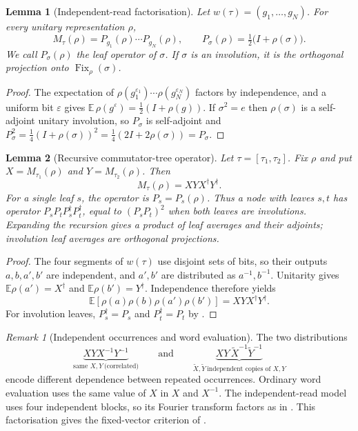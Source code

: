 \documentclass[11pt]{amsart}
\newtheorem{lemma}[lemma]{Lemma}
\theoremstyle{definition}
\theoremstyle{remark}
\newtheorem{remark}[remark]{Remark}
\theoremstyle{plain}
\theoremstyle{plain}
\numberwithin{equation}{section}
\DeclareMathOperator{\Fix}{Fix}
\begin{document}
\begin{lemma}[Independent-read factorisation]
\label{lem:factor}
Let $w(\tau)=(g_1,\ldots,g_N)$. For every unitary representation $\rho$,
\[
 M_\tau(\rho)=P_{g_1}(\rho)\cdots P_{g_N}(\rho),
 \qquad
 P_\sigma(\rho)=\tfrac12\bigl(I+\rho(\sigma)\bigr).
\]
We call $P_\sigma(\rho)$ the \emph{leaf operator} of $\sigma$. If
$\sigma$ is an involution, it is the orthogonal projection onto
$\Fix_\rho(\sigma)$.
\end{lemma}
\begin{proof}
The expectation of
$\rho(g_1^{\varepsilon_1})\cdots\rho(g_N^{\varepsilon_N})$ factors by
independence, and a uniform bit $\varepsilon$ gives
$\mathbb E\,\rho(g^{\varepsilon})=\tfrac12(I+\rho(g))$. If $\sigma^2=e$ then $\rho(\sigma)$ is a self-adjoint
unitary involution, so $P_\sigma$ is self-adjoint and
$P_\sigma^2=\tfrac14(I+\rho(\sigma))^2=\tfrac14(2I+2\rho(\sigma))=P_\sigma$.
\end{proof}

\begin{lemma}[Recursive commutator-tree operator]
\label{lem:tree}
Let $\tau=[\tau_1,\tau_2]$. Fix $\rho$
and put $X=M_{\tau_1}(\rho)$ and $Y=M_{\tau_2}(\rho)$. Then
\[
 M_\tau(\rho)=XYX^\dagger Y^\dagger.
\]
For a single leaf $s$, the operator is $P_s=P_s(\rho)$. Thus a node
with leaves $s,t$ has operator $P_sP_tP_s^\dagger P_t^\dagger$, equal
to $(P_sP_t)^2$ when both leaves are involutions.
Expanding the recursion gives a product of leaf averages and their
adjoints; involution leaf averages are orthogonal projections.
\end{lemma}
\begin{proof}
The four segments of $w(\tau)$ use disjoint sets of bits, so their
outputs $a,b,a',b'$ are independent, and $a',b'$ are distributed as
$a^{-1},b^{-1}$. Unitarity gives
$\mathbb E\rho(a')=X^\dagger$ and $\mathbb E\rho(b')=Y^\dagger$.
Independence therefore yields
\[
 \mathbb E[\rho(a)\rho(b)\rho(a')\rho(b')]=XYX^\dagger Y^\dagger.
\]
For involution leaves, $P_s^\dagger=P_s$ and $P_t^\dagger=P_t$
by .
\end{proof}

\begin{remark}[Independent occurrences and word evaluation]
\label{rem:notxy}
The two distributions
\[
\underbrace{XYX^{-1}Y^{-1}}_{\text{same }X,Y\ \text{(correlated)}}
\qquad\text{and}\qquad
\underbrace{XY\,\tilde X^{-1}\tilde Y^{-1}}_{\tilde X,\tilde Y\ \text{independent copies of }X,Y}
\]
encode different dependence between repeated occurrences. Ordinary word
evaluation uses the same value of $X$ in $X$ and $X^{-1}$. The
independent-read model uses four independent blocks, so its Fourier
transform factors as in . This factorisation gives the
fixed-vector criterion of .
\end{remark}
\end{document}
